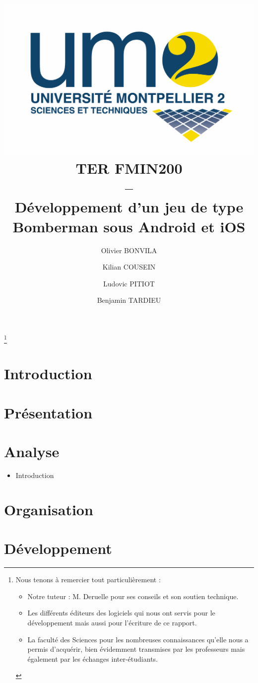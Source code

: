 \documentclass[a4paper,11pt]{report}
\title{
	\includegraphics[scale=.2]{logofds.eps}\\
	\vspace*{1cm}
	TER FMIN200 \\ 
	-- \\
	Développement d'un jeu de type Bomberman sous Android et iOS
}
\author{Olivier BONVILA \and Kilian COUSEIN \and Ludovic PITIOT \and Benjamin TARDIEU}
\date{}
\begin{document}
\maketitle

\thanks {
  	Nous tenons à remercier tout particulièrement :
	\begin{itemize}
		\item Notre tuteur : M. Deruelle pour ses conseils et son soutien technique.
		\item Les différents  éditeurs des logiciels qui nous ont servis pour le développement mais aussi pour l’écriture de ce rapport.
		\item La faculté des Sciences pour les nombreuses connaissances qu’elle nous a permis d’acquérir, bien évidemment transmises par les professeurs mais également par les échanges inter-étudiants.
	\end{itemize}
}

\tableofcontents



\chapter{Introduction}

	

\chapter{Présentation}

	
	
	
\chapter{Analyse}
	\begin{itemize}
		\item Introduction
	\end{itemize}
	
	
	

\chapter{Organisation}

	


\chapter{Développement}
\end{document}
